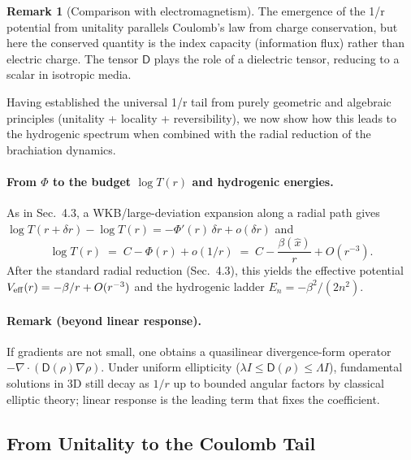 \documentclass[11pt]{article}
\theoremstyle{plain}
\theoremstyle{definition}
\newtheorem{remark}[theorem]{Remark}
\begin{document}
\begin{remark}[Comparison with electromagnetism]
  The emergence of the 1/r potential from unitality parallels Coulomb's law
  from charge conservation, but here the conserved quantity is the index
  capacity (information flux) rather than electric charge. The tensor
  $\mathsf{D}$ plays the role of a dielectric tensor, reducing to a scalar
  in isotropic media.
\end{remark}

Having established the universal 1/r tail from purely geometric and
algebraic principles (unitality + locality + reversibility), we now
show how this leads to the hydrogenic spectrum when combined with the
radial reduction of the brachiation dynamics.

\paragraph{From $\Phi$ to the budget $\log T(r)$ and hydrogenic energies.}
As in Sec.~4.3, a WKB/large-deviation expansion along a radial path gives
$\log T(r+\delta r)-\log T(r)=-\Phi'(r)\,\delta r+o(\delta r)$ and
\[
  \log T(r) \;=\; C - \Phi(r) + o(1/r)
  \;=\; C - \frac{\beta(\hat{x})}{r} + O(r^{-3}).
\]
After the standard radial reduction (Sec.~4.3), this yields the effective potential $V_{\rm eff}(r)=-\beta/r+O(r^{-3})$ and the hydrogenic ladder $E_n=-\beta^2/(2n^2)$.

\paragraph{Remark (beyond linear response).}
If gradients are not small, one obtains a quasilinear divergence-form operator $-\nabla\!\cdot\!(\mathsf{D}(\rho)\nabla\rho)$.
Under uniform ellipticity ($\lambda I\le \mathsf{D}(\rho)\le \Lambda I$), fundamental solutions in 3D still decay as $1/r$ up to bounded angular factors by classical elliptic theory; linear response is the leading term that fixes the coefficient.

\subsection{From Unitality to the Coulomb Tail}
\label{subsec:unitality-coulomb}
\end{document}
